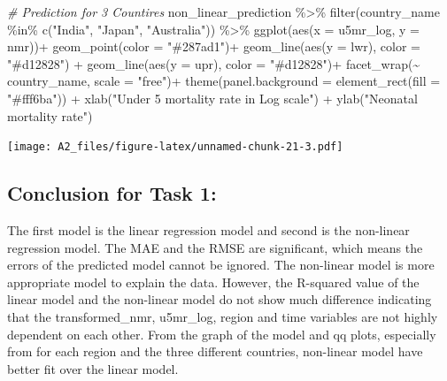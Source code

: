 \documentclass[
]{article}
\newenvironment{Shaded}{\begin{snugshade}}{\end{snugshade}}
\newcommand{\AttributeTok}[1]{\textcolor[rgb]{0.77,0.63,0.00}{#1}}
\newcommand{\CommentTok}[1]{\textcolor[rgb]{0.56,0.35,0.01}{\textit{#1}}}
\newcommand{\FunctionTok}[1]{\textcolor[rgb]{0.00,0.00,0.00}{#1}}
\newcommand{\NormalTok}[1]{#1}
\newcommand{\SpecialCharTok}[1]{\textcolor[rgb]{0.00,0.00,0.00}{#1}}
\newcommand{\StringTok}[1]{\textcolor[rgb]{0.31,0.60,0.02}{#1}}
\begin{document}
\begin{Shaded}
\begin{Highlighting}[]
\CommentTok{\#  Prediction for 3 Countires}
\NormalTok{ non\_linear\_prediction }\SpecialCharTok{\%\textgreater{}\%}
  \FunctionTok{filter}\NormalTok{(country\_name }\SpecialCharTok{\%in\%} \FunctionTok{c}\NormalTok{(}\StringTok{"India"}\NormalTok{, }\StringTok{"Japan"}\NormalTok{, }\StringTok{"Australia"}\NormalTok{)) }\SpecialCharTok{\%\textgreater{}\%} 
  \FunctionTok{ggplot}\NormalTok{(}\FunctionTok{aes}\NormalTok{(}\AttributeTok{x =}\NormalTok{ u5mr\_log, }\AttributeTok{y =}\NormalTok{ nmr))}\SpecialCharTok{+}
  \FunctionTok{geom\_point}\NormalTok{(}\AttributeTok{color =} \StringTok{"\#287ad1"}\NormalTok{)}\SpecialCharTok{+}
  \FunctionTok{geom\_line}\NormalTok{(}\FunctionTok{aes}\NormalTok{(}\AttributeTok{y =}\NormalTok{ lwr), }\AttributeTok{color =} \StringTok{"\#d12828"}\NormalTok{) }\SpecialCharTok{+}
  \FunctionTok{geom\_line}\NormalTok{(}\FunctionTok{aes}\NormalTok{(}\AttributeTok{y =}\NormalTok{ upr), }\AttributeTok{color =} \StringTok{"\#d12828"}\NormalTok{)}\SpecialCharTok{+}
  \FunctionTok{facet\_wrap}\NormalTok{(}\SpecialCharTok{\textasciitilde{}}\NormalTok{ country\_name, }\AttributeTok{scale =} \StringTok{"free"}\NormalTok{)}\SpecialCharTok{+}
  \FunctionTok{theme}\NormalTok{(}\AttributeTok{panel.background =} \FunctionTok{element\_rect}\NormalTok{(}\AttributeTok{fill =} \StringTok{"\#fff6ba"}\NormalTok{)) }\SpecialCharTok{+}
  \FunctionTok{xlab}\NormalTok{(}\StringTok{"Under 5 mortality rate in Log scale"}\NormalTok{) }\SpecialCharTok{+}
  \FunctionTok{ylab}\NormalTok{(}\StringTok{"Neonatal mortality rate"}\NormalTok{)}
\end{Highlighting}
\end{Shaded}

\texttt{[image: A2\_files/figure-latex/unnamed-chunk-21-3.pdf]}

\hypertarget{conclusion-for-task-1}{%
\subsection{Conclusion for Task 1:}\label{conclusion-for-task-1}}

The first model is the linear regression model and second is the
non-linear regression model. The MAE and the RMSE are significant, which
means the errors of the predicted model cannot be ignored. The
non-linear model is more appropriate model to explain the data. However,
the R-squared value of the linear model and the non-linear model do not
show much difference indicating that the transformed\_nmr, u5mr\_log,
region and time variables are not highly dependent on each other. From
the graph of the model and qq plots, especially from for each region and
the three different countries, non-linear model have better fit over the
linear model.
\end{document}
